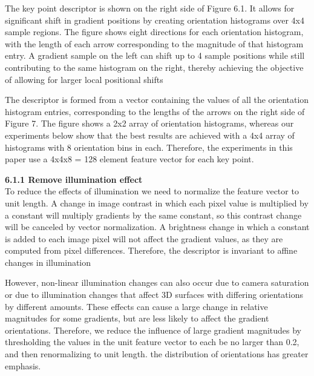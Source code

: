 \documentclass[12pt,a4paper]{report}
\begin{document}
\begin{flushleft}
The key point descriptor is shown on the right side of Figure 6.1. It allows for significant
shift in gradient positions by creating orientation histograms over 4x4 sample regions. The figure shows eight directions for each orientation histogram, with the length of each arrow corresponding to the magnitude of that histogram entry. A gradient sample on the left can shift up to 4 sample positions while still contributing to the same histogram on the right, thereby achieving the objective of allowing for larger local positional shifts\par
\vspace{7 mm}
The descriptor is formed from a vector containing the values of all the orientation histogram entries, corresponding to the lengths of the arrows on the right side of Figure 7. The figure shows a 2x2 array of orientation histograms, whereas our experiments below show that the best results are achieved with a 4x4 array of histograms with 8 orientation bins in each. Therefore, the experiments in this paper use a 4x4x8 = 128 element feature vector for each key point.\par

\vspace{7 mm}


\textbf{6.1.1  Remove illumination effect}\\
 To reduce the effects of illumination we need to normalize the feature vector to unit length. A change in image contrast in which each pixel value is multiplied by a constant will multiply gradients by the same constant, so this contrast change will be canceled by vector normalization. A brightness change in which a constant is added to each image pixel will not affect the gradient values, as they are computed from pixel differences. Therefore, the descriptor is invariant to affine changes in illumination\par




\vspace{7mm}
However, non-linear illumination changes can also occur due to camera saturation or due to illumination changes that affect 3D surfaces with differing orientations by different amounts. These effects can cause a large change in relative magnitudes for some gradients, but are less likely to affect the gradient orientations. Therefore, we reduce the influence of large gradient magnitudes by thresholding the values in the unit feature vector to each be no larger than 0.2, and then renormalizing to unit length. the distribution of orientations has greater emphasis.





\end{flushleft}
\end{document}
